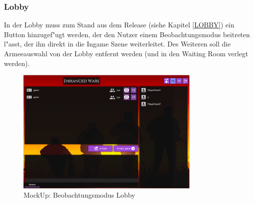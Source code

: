 \documentclass[12pt, titlepage]{scrartcl}
\newcommand{\RN}[1]{%
	\textup{\uppercase\expandafter{\romannumeral#1}}%
}
\begin{document}
	        \subsubsection{Lobby}
	            In der Lobby muss zum Stand aus dem Release \RN{2} (siehe Kapitel \ref{LOBBY}) ein Button hinzugef"ugt werden, der den Nutzer einem Beobachtungsmodus beitreten l"asst, der ihn direkt in die Ingame Szene weiterleitet. Des Weiteren soll die Armeeauswahl von der Lobby entfernt werden (und in den Waiting Room verlegt werden). \\
	            \begin{figure}[H] 
    				\centering
    				\includegraphics[width=0.8\textwidth]{images/mockUps/LobbyWatchMode.png}
    				\caption{MockUp: Beobachtungsmodus Lobby}
    				\label{Watch_Mode}
			    \end{figure}
\end{document}
